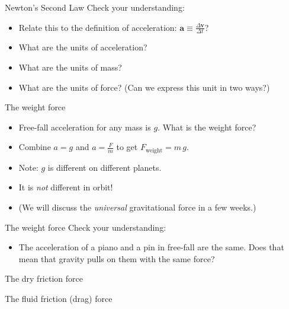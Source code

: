 \documentclass[english]{beamer}
\begin{document}
\begin{frame}{Newton's Second Law}
  Check your understanding: 
  \begin{itemize}
    \item Relate this to the definition of acceleration: $\mathbf{a} \equiv \frac{\Delta \mathbf{v}}{\Delta t}$?
    \item What are the units of acceleration?
    \item What are the units of mass? 
    \item What are the units of force? (Can we express this unit in two ways?)
  \end{itemize}
\end{frame}

\begin{frame}{The weight force}
  \begin{itemize}
    \item Free-fall acceleration for any mass is $g$. What is the weight force?
    \item Combine $a=g$ and $a=\frac{F}{m}$ to get $F_{\text{weight}}=m\,g$.
    \item Note: $g$ is different on different planets.
    \item It is \emph{not} different in orbit!
    \item (We will discuss the \emph{universal} gravitational force in a few weeks.)
  \end{itemize}
\end{frame}

\begin{frame}{The weight force}
  Check your understanding:
  \begin{itemize}
    \item The acceleration of a piano and a pin in free-fall are the same. Does that mean that gravity pulls on them with the same force?
  \end{itemize}
\end{frame}

\begin{frame}{The dry friction force}

\end{frame}

\begin{frame}{The fluid friction (drag) force}

\end{frame}
\end{document}
